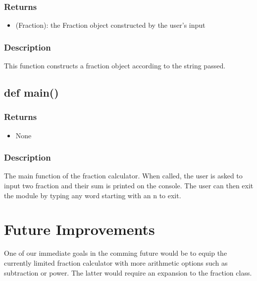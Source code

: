 \documentclass[refman]{scrartcl}
\begin{document}
\subsubsection*{Returns}

\begin{itemize}
	\item (Fraction): the Fraction object constructed by the user's input
\end{itemize}

\subsubsection*{Description}

This function constructs a fraction object according to the string passed.

\subsection{def main()}

\subsubsection*{Returns}

\begin{itemize}
	\item None
\end{itemize}

\subsubsection*{Description}

The main function of the fraction calculator. When called, the user is asked to input two fraction and their sum is printed on the console. The user can then exit the module by typing any word starting with an n to exit.

\section{Future Improvements}

One of our immediate goals in the comming future would be to equip the currently limited fraction calculator with more arithmetic options such as subtraction or power. The latter would require an expansion to the fraction class.
\end{document}
